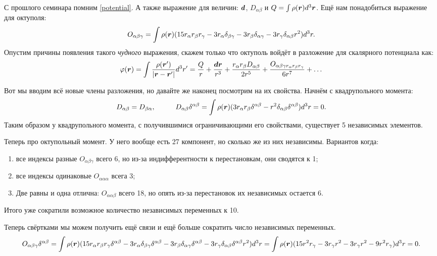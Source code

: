 С прошлого семинара помним \eqref{potential}. А также выражение для величин: $\mbox{\boldmath $d$}$, $D_{\alpha\beta}$ и $Q = \int \rho(\mbox{\boldmath $r$}) d^3 \mbox{\boldmath $r$}$.
Ещё нам понадобиться выражение для октуполя:
\begin{equation*}
	O_{\alpha \beta \gamma} = \int \rho(\mbox{\boldmath $r$}) (
	15 r_\alpha r_\beta r_\gamma - 3 r_\alpha \delta_{\beta\gamma} - 3 r_\beta \delta_{\alpha \gamma} - 3 r_\gamma \delta_{\alpha\beta} r^2
	) d^3 r.
\end{equation*}
Опустим причины появления такого \textit{чудного} выражения, скажем только что октуполь войдёт в разложение для скалярного потенциала как:
\begin{equation}
	\varphi(\mbox{\boldmath $r$}) = \int \frac{\rho (\mbox{\boldmath $r$}')}{|\mbox{\boldmath $r$} - \mbox{\boldmath $r$}'|}d^3 r'
	= \frac{Q}{r} + \frac{\mbox{\boldmath $d$} \mbox{\boldmath $r$}}{r^3} + \frac{r_\alpha r_\beta D_{\alpha\beta}}{2 r^5} + \frac{O_{\alpha\beta\gamma r_\alpha r_\beta r_\gamma}}{6 r^7} + \ldots
	\label{potential8}
\end{equation}

Вот мы вводим всё новые члены разложения, но давайте же наконец посмотрим на их свойства. Начнём с квадрупольного момента:
\begin{equation*}
	D_{\alpha\beta} = D_{\beta\alpha},
	\hspace{1 cm}
	D_{\alpha\beta} \delta^{\alpha\beta} = \int \rho(\mbox{\boldmath $r$}) (3 r_\alpha r_\beta \delta^{\alpha\beta} - r^2 \delta_{\alpha\beta} \delta^{\alpha\beta}) d^3 r = 0.
\end{equation*}
Таким образом у квадрупольного момента, с получившимися ограничивающими его свойствами, существует 5 независимых элементов.

Теперь про октупольный момент. У него вообще есть 27 компонент, но сколько же из них независимы. Вариантов когда:
\begin{enumerate}
	\item  все индексы разные $O_{\alpha\beta\gamma}$ всего 6, но из-за индифферентности к перестановкам, они сводятся к 1;
	\item все индексы одинаковые $O_{\alpha\alpha\alpha}$ всега 3;
	\item Две равны и одна отлична: $O_{\alpha\alpha\beta}$ всего 18, но опять из-за перестановок их независимых остается 6.
\end{enumerate}
Итого уже сократили возможное количество независимых переменных к 10.

Теперь свёртками мы можем получить ещё связи и ещё больше сократить число независимых переменных.
\begin{equation*}
	O_{\alpha\beta\gamma}\delta^{\alpha\beta} = \int \rho(\mbox{\boldmath $r$}) (
	15 r_\alpha r_\beta r_\gamma \delta^{\alpha\beta} - 3 r_\alpha \delta_{\beta\gamma} \delta^{\alpha\beta} - 3 r_\beta \delta_{\alpha \gamma} \delta^{\alpha\beta} - 3 r_\gamma \delta_{\alpha\beta} \delta^{\alpha\beta} r^2
	) d^3 r 
	= \int \rho(\mbox{\boldmath $r$}) (15 r^2 r_\gamma - 3 r_\gamma r^2 - 3 r_\gamma r^2 - 9 r^2 r_\gamma) d^3 r = 0.
\end{equation*}

